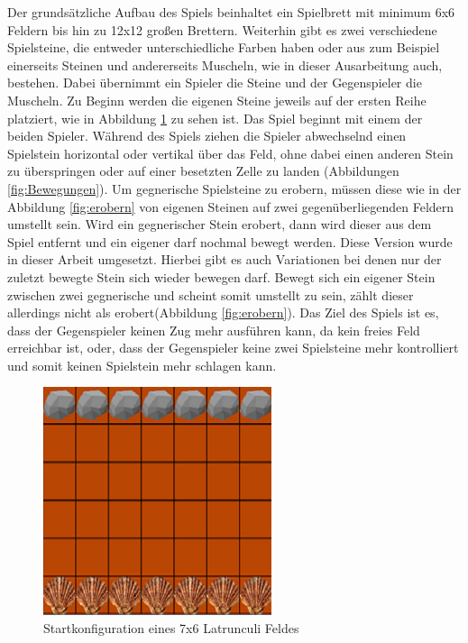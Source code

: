 Der grundsätzliche Aufbau des Spiels beinhaltet ein Spielbrett mit minimum 6x6 Feldern bis hin zu 12x12 großen Brettern. Weiterhin gibt es zwei verschiedene Spielsteine, die entweder unterschiedliche Farben haben oder aus zum Beispiel einerseits Steinen und andererseits Muscheln, wie in dieser Ausarbeitung auch, bestehen. Dabei übernimmt ein Spieler die Steine und der Gegenspieler die Muscheln. Zu Beginn werden die eigenen Steine jeweils auf der ersten Reihe platziert, wie in Abbildung \ref{fig:startzustand} zu sehen ist. Das Spiel beginnt mit einem der beiden Spieler. Während des Spiels ziehen die Spieler abwechselnd einen Spielstein horizontal oder vertikal über das Feld, ohne dabei einen anderen Stein zu überspringen oder auf einer besetzten Zelle zu landen (Abbildungen \ref{fig:Bewegungen}). Um gegnerische Spielsteine zu erobern, müssen diese wie in der Abbildung \ref{fig:erobern} von eigenen Steinen auf zwei gegenüberliegenden Feldern umstellt sein. Wird ein gegnerischer Stein erobert, dann wird dieser aus dem Spiel entfernt und ein eigener darf nochmal bewegt werden. Diese Version wurde in dieser Arbeit umgesetzt. Hierbei gibt es auch Variationen bei denen nur der zuletzt bewegte Stein sich wieder bewegen darf.
Bewegt sich ein eigener Stein zwischen zwei gegnerische und scheint somit umstellt zu sein, zählt dieser allerdings nicht als erobert(Abbildung \ref{fig:erobern}).
Das Ziel des Spiels ist es, dass der Gegenspieler keinen Zug mehr ausführen kann, da kein freies Feld erreichbar ist, oder, dass der Gegenspieler keine zwei Spielsteine mehr kontrolliert und somit keinen Spielstein mehr  schlagen kann.
\begin{figure}[h]
\centering
\includegraphics{img/regeln_startzustand22}
\caption{Startkonfiguration eines 7x6 Latrunculi Feldes}
\label{fig:startzustand}
\end{figure}
